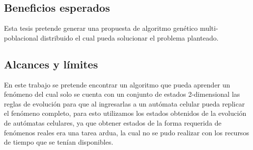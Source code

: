 \subsection{Beneficios esperados}
Esta tesis pretende generar una propuesta de algoritmo genético multi-poblacional distribuido el cual pueda solucionar el problema planteado.

\subsection{Alcances y límites}
En este trabajo se pretende encontrar un algoritmo que pueda aprender un fenómeno del cual solo se cuenta con un conjunto de estados 2-dimensional las reglas de evolución para que al ingresarlas a un autómata celular pueda replicar el fenómeno completo, para esto utilizamos los estados obtenidos de la evolución de autómatas celulares, ya que obtener estados de la forma requerida de fenómenos reales era una tarea ardua, la cual no se pudo realizar con los recursos de tiempo que se tenían disponibles.

\